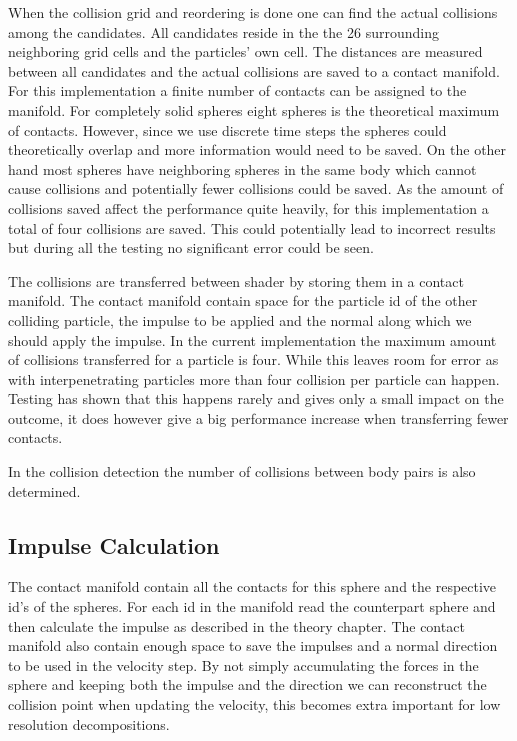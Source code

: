 When the collision grid and reordering is done one can find the actual collisions
among the candidates. All candidates reside in the the 26 surrounding neighboring
grid cells and the particles' own cell. The distances are measured between all
candidates and the actual collisions are saved to a contact manifold.
For this implementation a finite number of
contacts can be assigned to the manifold. For completely solid spheres eight spheres
is the theoretical maximum of contacts. However, since we use discrete time steps
the spheres could theoretically overlap and more information would need to be saved.
On the other hand most spheres have neighboring spheres in the same body which cannot
cause collisions and potentially fewer collisions could be saved. As the amount of
collisions saved affect the performance quite heavily, for this implementation a total
of four collisions are saved. This could potentially lead to incorrect results but
during all the testing no significant error could be seen.

The collisions are transferred between shader by storing them in a contact manifold.
The contact manifold contain space for the particle id of the other colliding particle,
the impulse to be applied and the normal along which we should apply the impulse.
In the current implementation the maximum amount of collisions transferred for a
particle is four. While this leaves room for error as with interpenetrating particles
more than four collision per particle can happen. Testing has shown that this happens
rarely and gives only a small impact on the outcome, it does however give a big
performance increase when transferring fewer contacts.

In the collision detection the number of collisions between body pairs is also determined.


\subsection{Impulse Calculation}
The contact manifold contain all the contacts for this sphere and the respective
id's of the spheres. For each id in the manifold read the counterpart sphere and
then calculate the impulse as described in the theory chapter. The contact manifold
also contain enough space to save the impulses and a normal direction to be used
in the velocity step. By not simply accumulating the forces in the sphere and keeping
both the impulse and the direction we can reconstruct the collision point when updating
the velocity, this becomes extra important for low resolution decompositions.


